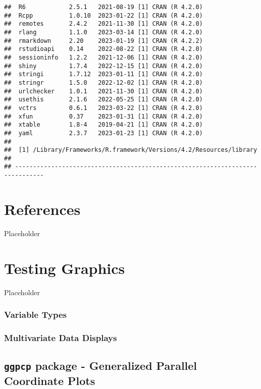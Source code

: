 \documentclass[print]{nuthesis}
\begin{document}
\begin{verbatim}
##  R6            2.5.1   2021-08-19 [1] CRAN (R 4.2.0)
##  Rcpp          1.0.10  2023-01-22 [1] CRAN (R 4.2.0)
##  remotes       2.4.2   2021-11-30 [1] CRAN (R 4.2.0)
##  rlang         1.1.0   2023-03-14 [1] CRAN (R 4.2.0)
##  rmarkdown     2.20    2023-01-19 [1] CRAN (R 4.2.2)
##  rstudioapi    0.14    2022-08-22 [1] CRAN (R 4.2.0)
##  sessioninfo   1.2.2   2021-12-06 [1] CRAN (R 4.2.0)
##  shiny         1.7.4   2022-12-15 [1] CRAN (R 4.2.0)
##  stringi       1.7.12  2023-01-11 [1] CRAN (R 4.2.0)
##  stringr       1.5.0   2022-12-02 [1] CRAN (R 4.2.0)
##  urlchecker    1.0.1   2021-11-30 [1] CRAN (R 4.2.0)
##  usethis       2.1.6   2022-05-25 [1] CRAN (R 4.2.0)
##  vctrs         0.6.1   2023-03-22 [1] CRAN (R 4.2.0)
##  xfun          0.37    2023-01-31 [1] CRAN (R 4.2.0)
##  xtable        1.8-4   2019-04-21 [1] CRAN (R 4.2.0)
##  yaml          2.3.7   2023-01-23 [1] CRAN (R 4.2.0)
## 
##  [1] /Library/Frameworks/R.framework/Versions/4.2/Resources/library
## 
## ------------------------------------------------------------------------------
\end{verbatim}

\hypertarget{references}{%
\chapter*{References}\label{references}}

Placeholder

\hypertarget{testing-graphics}{%
\chapter{Testing Graphics}\label{testing-graphics}}

Placeholder

\hypertarget{variable-types}{%
\subsection{Variable Types}\label{variable-types}}

\hypertarget{multivariate-data-displays}{%
\subsection{Multivariate Data Displays}\label{multivariate-data-displays}}

\hypertarget{ggpcp-package---generalized-parallel-coordinate-plots}{%
\section{\texorpdfstring{\texttt{ggpcp} package - Generalized Parallel Coordinate Plots}{ggpcp package - Generalized Parallel Coordinate Plots}}\label{ggpcp-package---generalized-parallel-coordinate-plots}}
\end{document}
